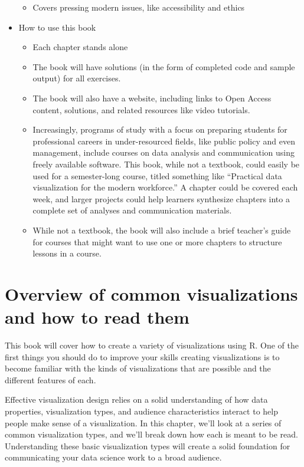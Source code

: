 \documentclass[
]{krantz}
\providecommand{\tightlist}{%
  \setlength{\itemsep}{0pt}\setlength{\parskip}{0pt}}
\begin{document}
\begin{itemize}
  \begin{itemize}
  \tightlist
  \item
    Covers pressing modern issues, like accessibility and ethics
  \end{itemize}
\item
  How to use this book

  \begin{itemize}
  \tightlist
  \item
    Each chapter stands alone
  \item
    The book will have solutions (in the form of completed code and sample output) for all exercises.
  \item
    The book will also have a website, including links to Open Access content, solutions, and related resources like video tutorials.
  \item
    Increasingly, programs of study with a focus on preparing students for professional careers in under-resourced fields, like public policy and even management, include courses on data analysis and communication using freely available software. This book, while not a textbook, could easily be used for a semester-long course, titled something like ``Practical data visualization for the modern workforce.'' A chapter could be covered each week, and larger projects could help learners synthesize chapters into a complete set of analyses and communication materials.
  \item
    While not a textbook, the book will also include a brief teacher's guide for courses that might want to use one or more chapters to structure lessons in a course.
  \end{itemize}
\end{itemize}

\mainmatter

\hypertarget{reading-visualizations}{%
\chapter{Overview of common visualizations and how to read them}\label{reading-visualizations}}

This book will cover how to create a variety of visualizations using R. One of the
first things you should do to improve your skills creating visualizations is to
become familiar with the kinds of visualizations that are possible and the different
features of each.

Effective visualization design relies on a solid understanding
of how data properties, visualization types, and audience characteristics interact
to help people make sense of a visualization. In this chapter, we'll look at
a series of common visualization types, and we'll break down how each is meant to
be read. Understanding these basic visualization types will create a solid foundation for
communicating your data science work to a broad audience.
\end{document}
